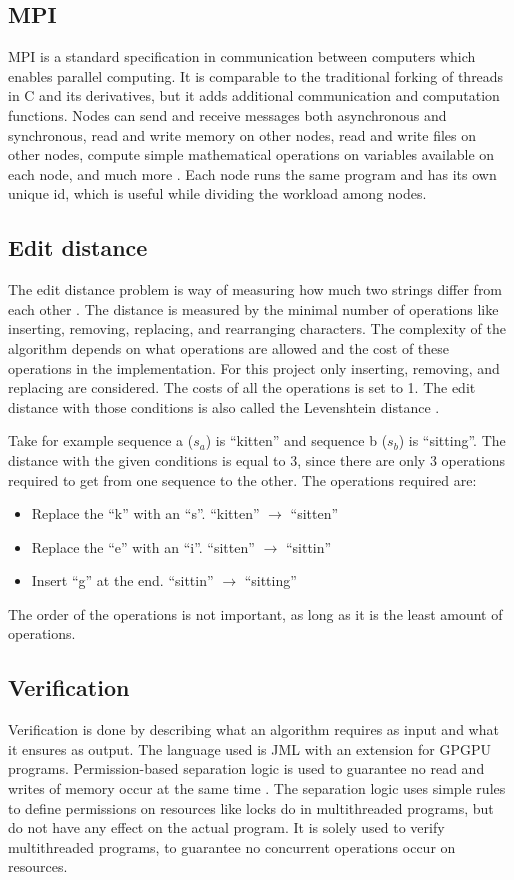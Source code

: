 \subsection{MPI}
MPI is a standard specification in communication between computers which enables parallel computing.
It is comparable to the traditional forking of threads in C and its derivatives, but it adds additional communication and computation functions.
Nodes can send and receive messages both asynchronous and synchronous, read and write memory on other nodes, read and write files on other nodes, compute simple mathematical operations on variables available on each node, and much more \cite{MPI}.
Each node runs the same program and has its own unique id, which is useful while dividing the workload among nodes.

\subsection{Edit distance}
The edit distance problem is way of measuring how much two strings differ from each other \cite{Navarro:2001:GTA:375360.375365}.
The distance is measured by the minimal number of operations like inserting, removing, replacing, and rearranging characters.
The complexity of the algorithm depends on what operations are allowed and the cost of these operations in the implementation.
For this project only inserting, removing, and replacing are considered.
The costs of all the operations is set to 1.
The edit distance with those conditions is also called the Levenshtein distance \cite{Navarro:2001:GTA:375360.375365}.

Take for example sequence a ($s_a$) is ``kitten'' and sequence b ($s_b$) is ``sitting''.
The distance with the given conditions is equal to 3, since there are only 3 operations required to get from one sequence to the other.
The operations required are:
\begin{itemize}
    \item Replace the ``k'' with an ``s''. ``kitten'' $\rightarrow$ ``sitten''
    \item Replace the ``e'' with an ``i''. ``sitten'' $\rightarrow$ ``sittin''
    \item Insert ``g'' at the end. ``sittin'' $\rightarrow$ ``sitting''
\end{itemize}
The order of the operations is not important, as long as it is the least amount of operations.

\subsection{Verification}
Verification is done by describing what an algorithm requires as input and what it ensures as output.
The language used is JML with an extension for GPGPU programs.
Permission-based separation logic is used to guarantee no read and writes of memory occur at the same time \cite{vercors}.
The separation logic uses simple rules to define permissions on resources like locks do in multithreaded programs, but do not have any effect on the actual program.
It is solely used to verify multithreaded programs, to guarantee no concurrent operations occur on resources.

